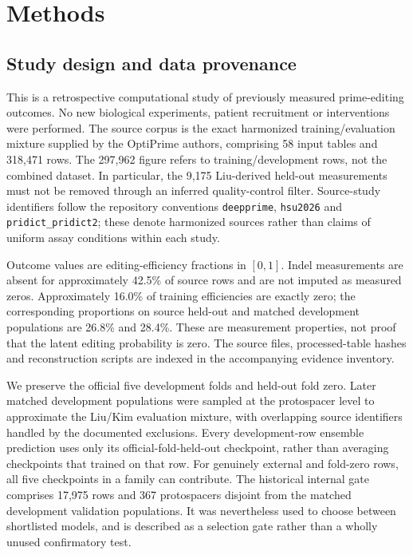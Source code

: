 \section{Methods}
\subsection{Study design and data provenance}
This is a retrospective computational study of previously measured prime-editing outcomes. No new biological experiments, patient recruitment or interventions were performed. The source corpus is the exact harmonized training/evaluation mixture supplied by the OptiPrime authors, comprising 58 input tables and 318,471 rows. The 297,962 figure refers to training/development rows, not the combined dataset. In particular, the 9,175 Liu-derived held-out measurements must not be removed through an inferred quality-control filter. Source-study identifiers follow the repository conventions \texttt{deepprime}, \texttt{hsu2026} and \texttt{pridict\_pridict2}; these denote harmonized sources rather than claims of uniform assay conditions within each study.

Outcome values are editing-efficiency fractions in $[0,1]$. Indel measurements are absent for approximately 42.5\% of source rows and are not imputed as measured zeros. Approximately 16.0\% of training efficiencies are exactly zero; the corresponding proportions on source held-out and matched development populations are 26.8\% and 28.4\%. These are measurement properties, not proof that the latent editing probability is zero. The source files, processed-table hashes and reconstruction scripts are indexed in the accompanying evidence inventory.

We preserve the official five development folds and held-out fold zero. Later matched development populations were sampled at the protospacer level to approximate the Liu/Kim evaluation mixture, with overlapping source identifiers handled by the documented exclusions. Every development-row ensemble prediction uses only its official-fold-held-out checkpoint, rather than averaging checkpoints that trained on that row. For genuinely external and fold-zero rows, all five checkpoints in a family can contribute. The historical internal gate comprises 17,975 rows and 367 protospacers disjoint from the matched development validation populations. It was nevertheless used to choose between shortlisted models, and is described as a selection gate rather than a wholly unused confirmatory test.

